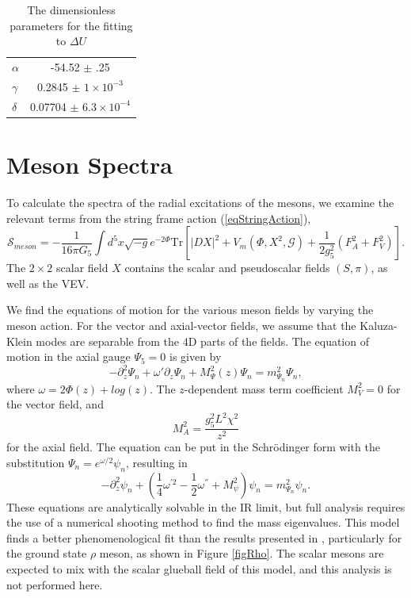\documentclass[aps,prd,12pt,nofootinbib]{revtex4}
\newcommand{\be}{\begin{equation}}
\newcommand{\ee}{\end{equation}}
\def\thalf{{\textstyle{\frac{1}{2}}}}
\def\oneqt{{\textstyle{\frac{1}{4}}}}
\newcommand{\cS}{\mathcal S}
\begin{document}
\begin{table}[htb]
\begin{center}
\label{tabFit}
\begin{tabular}{| l | c | }
\hline
$\alpha$ & -54.52 $\pm$ .25  \\
$\gamma$ & 0.2845 $\pm$ $ 1 \times 10^{-3}$ \\ 
$\delta$ & 0.07704 $\pm $ $6.3 \times 10^{-4}$\\ 
  \hline
\end{tabular}
\caption{The dimensionless parameters for the fitting to $\Delta U$}
\end{center}
\end{table}

\section{Meson Spectra}

To calculate the spectra of the radial excitations of the mesons, we examine the relevant terms from the string frame action (\ref{eqStringAction}),
\be
\cS_{meson}=-\frac{1}{16\pi G_5} \int d^5x \sqrt{-g} e^{-2\Phi}\mathrm{Tr}\left[ \left|DX\right|^2+V_m(\Phi,X^2,\mathcal{G})+\frac{1}{2g_5^2}\left(F_A^2 +F_V^2\right) \right].
\label{eqMesonL}
\ee
The $2 \times 2$ scalar  field $X$ contains the scalar and pseudoscalar fields $(S,\pi)$, as well as the VEV.

We find the equations of motion for the various meson fields by varying the meson action.
For the vector and axial-vector fields, we  assume that the Kaluza-Klein modes are separable from the 4D parts of the fields.
The equation of motion in the axial gauge $\Psi_5=0$  is given by
\be
-\partial_z^2\Psi_n+\omega'\partial_z\Psi_n +M_\Psi^2(z) \Psi_n=m^2_{\Psi_n}\Psi_n,
\ee
where $\omega=2\Phi(z)+log(z)$. 
The $z$-dependent mass term coefficient $M^2_V=0$  for the vector field, and 
\be
M^2_A=\frac{g_5^2L^2\chi^2}{z^2}
\ee
for the axial field.
The equation can be put in the Schr{\"o}dinger form with the substitution $\Psi_n=e^{\omega/2}\psi_n$, resulting in
\be
-\partial^2_z\psi_n+\left(\oneqt \omega^{'2}-\thalf\omega^{''}+M_\psi^2\right)\psi_n=m^2_{\Psi_n}\psi_n.
\ee
These equations are analytically solvable in the IR limit, but full analysis requires the use of a numerical shooting method to find the mass eigenvalues.
This model finds a better phenomenological fit than the results presented in \cite{gherghetta-kelley}, particularly for the ground state $\rho$ meson, as shown in Figure \ref{figRho}. 
The scalar mesons are expected to mix with the scalar glueball field of this model, and this analysis is not performed here. 
\end{document}
